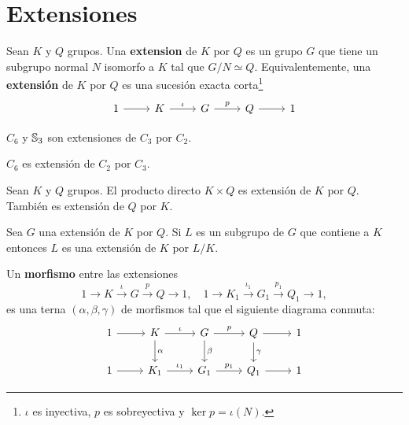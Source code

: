 \chapter{Extensiones}
\label{extensiones}

\begin{definition}
	Sean $K$ y $Q$ grupos. Una \textbf{extension} de $K$ por $Q$ es un grupo
	$G$ que tiene un subgrupo normal $N$ isomorfo a $K$ tal que $G/N\simeq Q$.
	Equivalentemente, una \textbf{extensión} de $K$ por $Q$ es una sucesión
	exacta corta\footnote{$\iota$ es inyectiva, $p$ es sobreyectiva y $\ker
	p=\iota(N)$.}
\[
\begin{tikzcd}
	1 & K & G & Q & 1
	\arrow[from=1-1, to=1-2]
	\arrow["\iota", from=1-2, to=1-3]
	\arrow["p", from=1-3, to=1-4]
	\arrow[from=1-4, to=1-5]
\end{tikzcd}
\]
\end{definition}

\begin{example}
	$C_6$ y $\mathbb{S}_3$ son extensiones de $C_3$ por $C_2$.
\end{example}

\begin{example}
	$C_6$ es extensión de $C_2$ por $C_3$.
\end{example}

\begin{example}
	Sean $K$ y $Q$ grupos. El producto directo $K\times Q$ es extensión de $K$
	por $Q$. También es extensión de $Q$ por $K$.
\end{example}

Sea $G$ una extensión de $K$ por $Q$. Si $L$ es un subgrupo de $G$ que
contiene a $K$ entonces $L$ es una extensión de $K$ por $L/K$. 

\begin{definition}
	Un \textbf{morfismo} entre las extensiones 
	\[
	1\to K\xrightarrow{\iota}G\xrightarrow{p} Q\to1,
	\quad
	1\to K_1\xrightarrow{\iota_1}G_1\xrightarrow{p_1} Q_1\to1,
	\]
	es una terna $(\alpha,\beta,\gamma)$ de morfismos tal que el siguiente
	diagrama conmuta:
\[\begin{tikzcd}
	1 & K & G & Q & 1 \\
	1 & {K_1} & {G_1} & {Q_1} & 1
	\arrow["\iota", from=1-2, to=1-3]
	\arrow["p", from=1-3, to=1-4]
	\arrow[from=1-4, to=1-5]
	\arrow[from=1-1, to=1-2]
	\arrow[from=2-1, to=2-2]
	\arrow["{\iota_1}", from=2-2, to=2-3]
	\arrow["{p_1}", from=2-3, to=2-4]
	\arrow[from=2-4, to=2-5]
	\arrow["\alpha", from=1-2, to=2-2]
	\arrow["\beta", from=1-3, to=2-3]
	\arrow["\gamma", from=1-4, to=2-4]
\end{tikzcd}\]
\end{definition}

